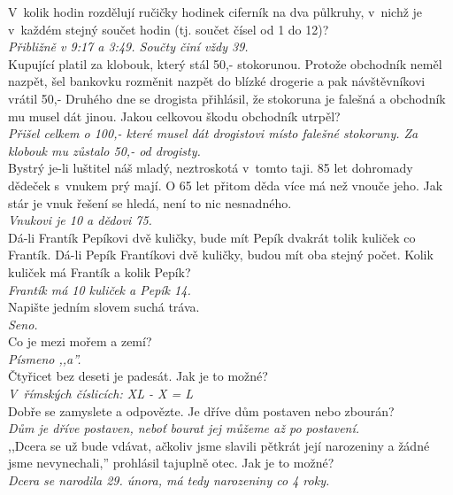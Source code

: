 \begin{multicols}{2}
\noindent
V~kolik hodin rozdělují ručičky hodinek ciferník 
na dva půlkruhy, v~nichž je v~každém stejný součet 
hodin (tj. součet čísel od 1 do 12)?\\[1 mm]
{\sl Přibližně v 9:17 a 3:49. Součty činí vždy 39.}\\

\noindent
Kupující platil za klobouk, který stál 50,- stokorunou. 
Protože obchodník neměl nazpět, šel bankovku rozměnit nazpět 
do blízké drogerie a pak návštěvníkovi vrátil 50,- Druhého dne 
se drogista přihlásil, že stokoruna je falešná a obchodník mu 
musel dát jinou. Jakou celkovou škodu obchodník utrpěl?\\[1 mm]
{\sl Přišel celkem o 100,- které musel dát drogistovi místo falešné 
stokoruny. Za klobouk mu zůstalo 50,- od drogisty.}\\

\noindent
Bystrý je-li luštitel náš mladý, neztroskotá v~tomto 
taji. 85 let dohromady dědeček s~vnukem prý mají. O 65 let přitom
děda více má než vnouče jeho. Jak stár je vnuk řešení se hledá,
není to nic nesnadného.\\[1 mm]
{\sl Vnukovi je 10 a dědovi 75.}\\

\noindent
Dá-li Frantík Pepíkovi dvě kuličky, bude mít Pepík dvakrát 
tolik kuliček co Frantík. Dá-li Pepík Frantíkovi dvě kuličky, 
budou mít oba stejný počet. Kolik kuliček má Frantík a kolik 
Pepík?\\[1 mm]
{\sl Frantík má 10 kuliček a Pepík 14.}\\

\noindent
Napište jedním slovem suchá tráva.\\[1 mm]
{\sl Seno.}\\

\noindent
Co je mezi mořem a zemí?\\[1 mm]
{\sl Písmeno ,,a''.}\\

\noindent
Čtyřicet bez deseti je padesát. Jak je to možné?\\[1 mm]
{\sl V~římských číslicích: XL - X = L}\\

\noindent
Dobře se zamyslete a odpovězte. Je dříve dům postaven 
nebo zbourán?\\[1 mm]
{\sl Dům je dříve postaven, neboť bourat jej můžeme až po postavení.}\\

\noindent
,,Dcera se už bude vdávat, ačkoliv jsme slavili pětkrát 
její narozeniny a žádné jsme nevynechali,'' prohlásil tajuplně 
otec. Jak je to možné?\\[1 mm]
{\sl Dcera se narodila 29. února, má tedy narozeniny co 4 roky.}\\


\end{multicols}
